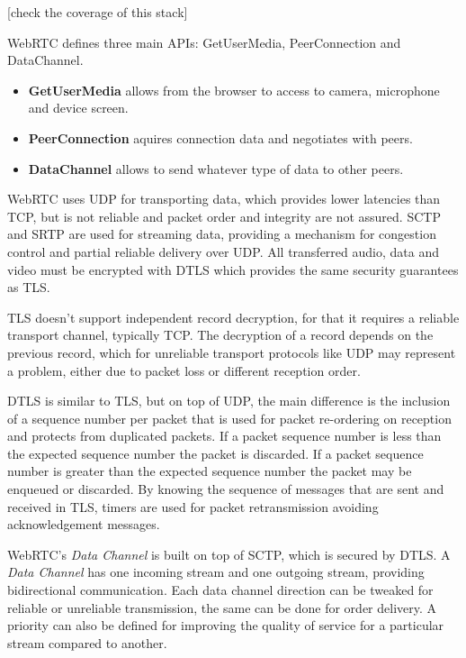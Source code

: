 {\color{magenta} [check the coverage of this stack]}

\ac{WebRTC} defines three main \ac{API}s: GetUserMedia, PeerConnection and DataChannel. 

\begin{itemize}
  \item \textbf{GetUserMedia} allows from the browser to access to camera, microphone and device screen. 

  \item \textbf{PeerConnection} aquires connection data and negotiates with peers.

  \item \textbf{DataChannel} allows to send whatever type of data to other peers.
\end{itemize}

\ac{WebRTC} uses \ac{UDP} for transporting data, which provides lower latencies than \ac{TCP}, but is not reliable and packet order and integrity are not assured. \ac{SCTP} and \ac{SRTP} are used for streaming data, providing a mechanism for congestion control and partial reliable delivery over \ac{UDP}. All transferred audio, data and video must be encrypted with \ac{DTLS} which provides the same security guarantees as \ac{TLS}. 

\ac{TLS} doesn't support independent record decryption, for that it requires a reliable transport channel, typically \ac{TCP}. The decryption of a record depends on the previous record, which for unreliable transport protocols like \ac{UDP} may represent a problem, either due to packet loss or different reception order.

\ac{DTLS} is similar to \ac{TLS}, but on top of \ac{UDP}, the main difference is the inclusion of a sequence number per packet that is used for packet re-ordering on reception and protects from duplicated packets. If a packet sequence number is less than the expected sequence number the packet is discarded. If a packet sequence number is greater than the expected sequence number the packet may be enqueued or discarded. By knowing the sequence of messages that are sent and received in \ac{TLS}, timers are used for packet retransmission avoiding acknowledgement messages.

\ac{WebRTC}'s \textit{Data Channel} is built on top of \ac{SCTP}, which is secured by \ac{DTLS}. A \textit{Data Channel} has one incoming stream and one outgoing stream, providing bidirectional communication. Each data channel direction can be tweaked for reliable or unreliable transmission, the same can be done for order delivery. A priority can also be defined for improving the quality of service for a particular stream compared to another.

